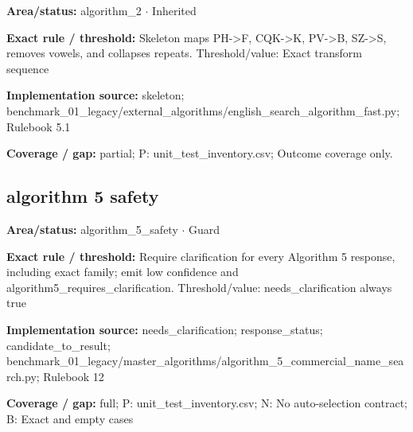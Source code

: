\begin{tcolorbox}[enhanced,breakable,colback=white,colframe=Muted!45,boxrule=0.45pt,arc=1.5pt,left=6pt,right=6pt,top=5pt,bottom=5pt,title={\texttt{A2-SKELETON-02}},title after break={\texttt{A2-SKELETON-02}\ (continued)},fonttitle=\headingfont\bfseries\color{Navy},coltitle=Navy]
\textbf{Area/status:} algorithm\_\allowbreak{}2 $\boldsymbol{\cdot}$ Inherited\par
\smallskip
\textbf{Exact rule / threshold:} Skeleton maps PH->F, CQK->K, PV->B, SZ->S, removes vowels, and collapses repeats. Threshold/\allowbreak{}value: Exact transform sequence\par
\smallskip
\textbf{Implementation source:} skeleton; benchmark\_\allowbreak{}01\_\allowbreak{}legacy/\allowbreak{}external\_\allowbreak{}algorithms/\allowbreak{}english\_\allowbreak{}search\_\allowbreak{}algorithm\_\allowbreak{}fast.py; Rulebook 5.1\par
\smallskip
\textbf{Coverage / gap:} partial; P: unit\_\allowbreak{}test\_\allowbreak{}inventory.csv; Outcome coverage only.
\end{tcolorbox}
\medskip
\subsection*{algorithm 5 safety}
\begin{tcolorbox}[enhanced,breakable,colback=white,colframe=Muted!45,boxrule=0.45pt,arc=1.5pt,left=6pt,right=6pt,top=5pt,bottom=5pt,title={\texttt{A5-ALWAYS-CONFIRM-22}},title after break={\texttt{A5-ALWAYS-CONFIRM-22}\ (continued)},fonttitle=\headingfont\bfseries\color{Navy},coltitle=Navy]
\textbf{Area/status:} algorithm\_\allowbreak{}5\_\allowbreak{}safety $\boldsymbol{\cdot}$ Guard\par
\smallskip
\textbf{Exact rule / threshold:} Require clarification for every Algorithm 5 response, including exact family; emit low confidence and algorithm5\_\allowbreak{}requires\_\allowbreak{}clarification. Threshold/\allowbreak{}value: needs\_\allowbreak{}clarification always true\par
\smallskip
\textbf{Implementation source:} needs\_\allowbreak{}clarification; response\_\allowbreak{}status; candidate\_\allowbreak{}to\_\allowbreak{}result; benchmark\_\allowbreak{}01\_\allowbreak{}legacy/\allowbreak{}master\_\allowbreak{}algorithms/\allowbreak{}algorithm\_\allowbreak{}5\_\allowbreak{}commercial\_\allowbreak{}name\_\allowbreak{}search.py; Rulebook 12\par
\smallskip
\textbf{Coverage / gap:} full; P: unit\_\allowbreak{}test\_\allowbreak{}inventory.csv; N: No auto-selection contract; B: Exact and empty cases
\end{tcolorbox}
\medskip
